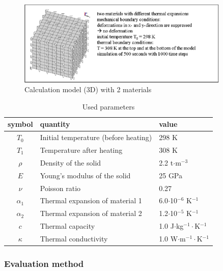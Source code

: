 \begin{figure}[htbp]
\centering
\includegraphics[width=0.9\textwidth]{TM/figures/fig65.eps}
\caption{Calculation model (3D) with 2 materials}
\label{fig65}
\end{figure}

\begin{table}[htbp]
\centering
\begin{tabular}{|c|l|l|}
\hline
symbol & quantity & value \\
\hline
$T_0$  & Initial temperature (before heating) & 298 K \\
\hline
$T_1$  & Temperature after heating & 308 K \\
\hline
$\rho$  & Density of the solid &  2.2 t$\cdot$m$^{-3}$  \\			
\hline
$E$ & Young's modulus of the solid & 25 GPa \\
\hline
$\nu$ & Poisson ratio & 0.27 \\
\hline
$\alpha_1$ & Thermal expansion of material 1 & 6.0$\cdot$10$^{-6}$ K$^{-1}$ \\
\hline
$\alpha_2$ & Thermal expansion of material 2 & 1.2$\cdot$10$^{-5}$ K$^{-1}$ \\
\hline
$c$      & Thermal capacity & 1.0 J$\cdot$kg$^{-1}\cdot$K$^{-1}$ \\
\hline
$\kappa$ & Thermal conductivity & 1.0 W$\cdot$m$^{-1}\cdot$K$^{-1}$ \\
\hline
\end{tabular}
\caption{Used parameters}
\label{tab62}
\end{table}


\subsubsection{Evaluation method}

